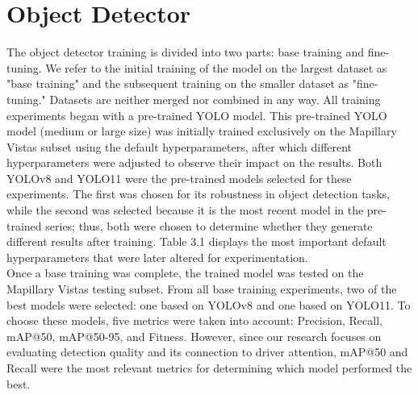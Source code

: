 \section{Object Detector}\label{sec:objectdetector}

The object detector training is divided into two parts: base training and fine-tuning. We refer to the initial training of the model on the largest dataset as "base training" and the subsequent training on the smaller dataset as "fine-tuning." Datasets are neither merged nor combined in any way. All training experiments began with a pre-trained YOLO model. This pre-trained YOLO model (medium or large size) was initially trained exclusively on the Mapillary Vistas subset using the default hyperparameters, after which different hyperparameters were adjusted to observe their impact on the results. Both YOLOv8 and YOLO11 were the pre-trained models selected for these experiments. The first was chosen for its robustness in object detection tasks, while the second was selected because it is the most recent model in the pre-trained series; thus, both were chosen to determine whether they generate different results after training. Table 3.1 displays the most important default hyperparameters that were later altered for experimentation. \\

Once a base training was complete, the trained model was tested on the Mapillary Vistas testing subset. From all base training experiments, two of the best models were selected: one based on YOLOv8 and one based on YOLO11. To choose these models, five metrics were taken into account: Precision, Recall, mAP@50, mAP@50-95, and Fitness. However, since our research focuses on evaluating detection quality and its connection to driver attention, mAP@50 and Recall were the most relevant metrics for determining which model performed the best.\\

